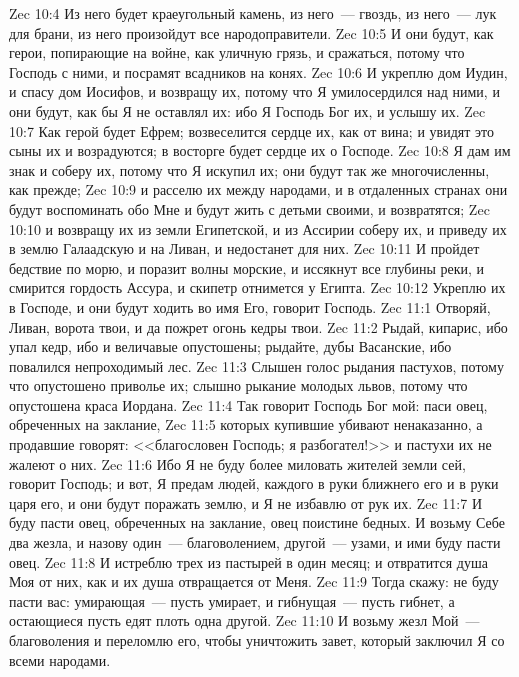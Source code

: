 \vs Zec 10:4 Из него будет краеугольный камень, из него~--- гвоздь, из него~--- лук для брани, из него произойдут все народоправители.
\vs Zec 10:5 И они будут, как герои, попирающие  на войне, как уличную грязь, и сражаться, потому что Господь с ними, и посрамят всадников на конях.
\vs Zec 10:6 И укреплю дом Иудин, и спасу дом Иосифов, и возвращу их, потому что Я умилосердился над ними, и они будут, как бы Я не оставлял их: ибо Я Господь Бог их, и услышу их.
\vs Zec 10:7 Как герой будет Ефрем; возвеселится сердце их, как от вина; и увидят это сыны их и возрадуются; в восторге будет сердце их о Господе.
\vs Zec 10:8 Я дам им знак и соберу их, потому что Я искупил их; они будут так же многочисленны, как прежде;
\vs Zec 10:9 и расселю их между народами, и в отдаленных странах они будут воспоминать обо Мне и будут жить с детьми своими, и возвратятся;
\vs Zec 10:10 и возвращу их из земли Египетской, и из Ассирии соберу их, и приведу их в землю Галаадскую и на Ливан, и недостанет  для них.
\vs Zec 10:11 И пройдет бедствие по морю, и поразит волны морские, и иссякнут все глубины реки, и смирится гордость Ассура, и скипетр отнимется у Египта.
\vs Zec 10:12 Укреплю их в Господе, и они будут ходить во имя Его, говорит Господь.
\vs Zec 11:1 Отворяй, Ливан, ворота твои, и да пожрет огонь кедры твои.
\vs Zec 11:2 Рыдай, кипарис, ибо упал кедр, ибо и величавые опустошены; рыдайте, дубы Васанские, ибо повалился непроходимый лес.
\vs Zec 11:3 Слышен голос рыдания пастухов, потому что опустошено приволье их; слышно рыкание молодых львов, потому что опустошена краса Иордана.
\vs Zec 11:4 Так говорит Господь Бог мой: паси овец, обреченных на заклание,
\vs Zec 11:5 которых купившие убивают ненаказанно, а продавшие говорят: <<благословен Господь; я разбогател!>> и пастухи их не жалеют о них.
\vs Zec 11:6 Ибо Я не буду более миловать жителей земли сей, говорит Господь; и вот, Я предам людей, каждого в руки ближнего его и в руки царя его, и они будут поражать землю, и Я не избавлю от рук их.
\vs Zec 11:7 И буду пасти овец, обреченных на заклание, овец поистине бедных. И возьму Себе два жезла, и назову один~--- благоволением, другой~--- узами, и ими буду пасти овец.
\vs Zec 11:8 И истреблю трех из пастырей в один месяц; и отвратится душа Моя от них, как и их душа отвращается от Меня.
\vs Zec 11:9 Тогда скажу: не буду пасти вас: умирающая~--- пусть умирает, и гибнущая~--- пусть гибнет, а остающиеся пусть едят плоть одна другой.
\vs Zec 11:10 И возьму жезл Мой~--- благоволения и переломлю его, чтобы уничтожить завет, который заключил Я со всеми народами.

